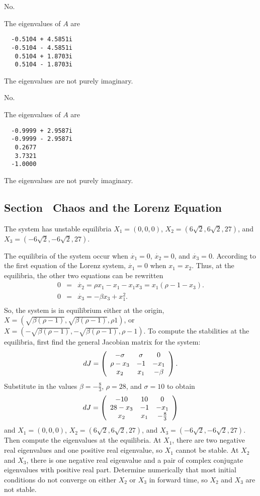 \documentclass{ximera}
\begin{document}
 \ans No.

\soln The eigenvalues of $A$ are 
\begin{verbatim}
  -0.5104 + 4.5851i
  -0.5104 - 4.5851i
   0.5104 + 1.8703i
   0.5104 - 1.8703i
\end{verbatim}
The eigenvalues are not purely imaginary.

 \ans No.

\soln The eigenvalues of $A$ are 
\begin{verbatim}
  -0.9999 + 2.9587i
  -0.9999 - 2.9587i
   0.2677          
   3.7321          
  -1.0000          
\end{verbatim}
The eigenvalues are not purely imaginary.



\newpage
\subsection*{Section~\protect{\ref{S:chaos}} Chaos and the Lorenz Equation}

 \ans The system has unstable equilibria $X_1 = (0,0,0)$, 
$X_2 = (6\sqrt{2},6\sqrt{2},27)$, and $X_3 = (-6\sqrt{2},-6\sqrt{2},27)$.

\soln The equilibria of the system occur when $\dot{x_1} = 0$, $\dot{x_2}
= 0$, and $\dot{x_3} = 0$.  According to the first equation of the Lorenz
system, $\dot{x_1} = 0$ when $x_1 = x_2$.  Thus, at the equilibria, the
other two equations can be rewritten
\[
\begin{array}{rcl}
0 & = & \dot{x_2} = \rho x_1 - x_1 - x_1x_3 = x_1(\rho - 1 - x_3). \\
0 & = & \dot{x_3} = -\beta x_3 + x_1^2. \\
\end{array}
\]
So, the system is in equilibrium either at the origin, $X =
(\sqrt{\beta (\rho - 1)}, \sqrt{\beta (\rho - 1)}, \rho 1)$, or
$X = (-\sqrt{\beta (\rho - 1)}, -\sqrt{\beta (\rho - 1)}, \rho - 1)$.
To compute the stabilities at the equilibria, first find the general
Jacobian matrix for the system:
\[
dJ = \left(\begin{array}{ccc} -\sigma & \sigma & 0 \\ \rho - x_3 & -1 & -x_1 \\ x_2 & x_1 & -\beta\end{array}\right).
\]
Substitute in the values $\beta = -\frac{8}{3}$, $\rho = 28$, and $\sigma
= 10$ to obtain
\[
dJ = \left(\begin{array}{ccc} -10 & 10 & 0 \\ 28 - x_3 & -1 & -x_1 \\ x_2 & x_1 & -\frac{8}{3}\end{array}\right)
\]
and $X_1 = (0,0,0)$, $X_2 = (6\sqrt{2},6\sqrt{2},27)$, and
$X_3 = (-6\sqrt{2},-6\sqrt{2},27)$.  Then compute the eigenvalues at the
equilibria.  At $X_1$, there are two negative real eigenvalues and one 
positive real eigenvalue, so $X_1$ cannot be stable.  At $X_2$ and $X_3$,
there is one negative real eigenvalue and a pair of complex conjugate
eigenvalues with positive real part.  Determine numerically that most
initial conditions do not converge on either $X_2$ or $X_3$ in forward time,
so $X_2$ and $X_3$ are not stable.
\end{document}
